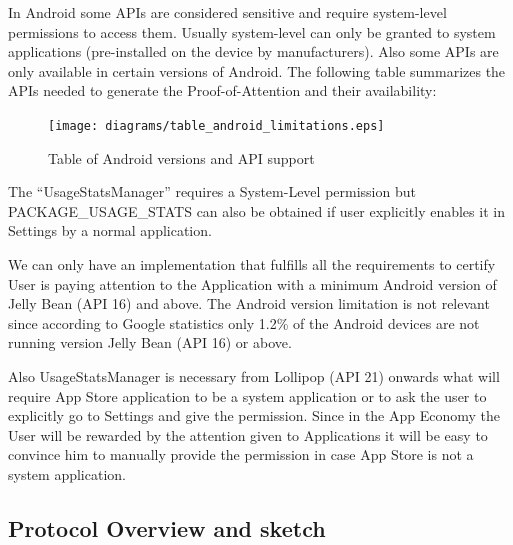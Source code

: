 In Android some APIs are considered sensitive and require system-level permissions to access them. Usually system-level can only be granted to system applications (pre-installed on the device by manufacturers). Also some APIs are only available in certain versions of Android. The following table summarizes the APIs needed to generate the Proof-of-Attention and their availability:


\begin{figure}[!ht]
\centering
\texttt{[image: diagrams/table\_android\_limitations.eps]}
\caption{Table of Android versions and API support}
\label{fig:android_versions}
\end{figure}

The ``UsageStatsManager'' requires a System-Level permission but PACKAGE\_USAGE\_STATS can also be obtained if user explicitly enables it in Settings by a normal application.

We can only have an implementation that fulfills all the requirements to certify User is paying attention to the Application with a minimum Android version of Jelly Bean (API 16) and above. The Android version limitation is not relevant since according to Google statistics only 1.2\% of the Android devices are not running version Jelly Bean (API 16) or above. 

Also UsageStatsManager is necessary from Lollipop (API 21) onwards what will require App Store application to be a system application or to ask the user to explicitly go to Settings and give the permission. Since in the App Economy the User will be rewarded by the attention given to Applications it will be easy to convince him to manually provide the permission in case App Store is not a system application.


\subsection{Protocol Overview and sketch}





%


